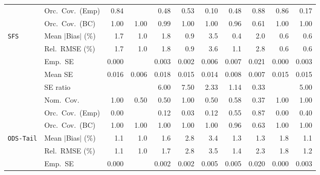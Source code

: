\begin{landscape}
\begin{longtable}{llrrrrrrrrr}
 & Orc.\ Cov.\ (Emp) & \cellcolor{rankthree}0.84 &  & 0.48 & 0.53 & 0.10 & 0.48 & \cellcolor{rankone}0.88 & \cellcolor{ranktwo}0.86 & 0.17 \\
 & Orc.\ Cov.\ (BC) & \cellcolor{rankthree}1.00 & \cellcolor{rankthree}1.00 & \cellcolor{ranktwo}0.99 & \cellcolor{rankthree}1.00 & \cellcolor{rankthree}1.00 & \cellcolor{rankone}0.96 & 0.61 & \cellcolor{rankthree}1.00 & \cellcolor{rankthree}1.00 \\
\addlinespace[2pt]
\quad \texttt{SFS} & Mean $|$Bias$|$ (\%) & 1.7 & 1.0 & 1.8 & \cellcolor{rankthree}0.9 & 3.5 & \cellcolor{rankone}0.4 & 2.0 & \cellcolor{ranktwo}0.6 & \cellcolor{ranktwo}0.6 \\
 & Rel.\ RMSE (\%) & 1.7 & \cellcolor{rankthree}1.0 & 1.8 & \cellcolor{ranktwo}0.9 & 3.6 & 1.1 & 2.8 & \cellcolor{rankone}0.6 & \cellcolor{rankone}0.6 \\
 & Emp.\ SE & 0.000 &  & 0.003 & 0.002 & 0.006 & 0.007 & 0.021 & 0.000 & 0.003 \\
 & Mean SE & 0.016 & 0.006 & 0.018 & 0.015 & 0.014 & 0.008 & 0.007 & 0.015 & 0.015 \\
 & SE ratio &  &  & 6.00 & 7.50 & \cellcolor{rankthree}2.33 & \cellcolor{rankone}1.14 & \cellcolor{ranktwo}0.33 &  & 5.00 \\
 & Nom.\ Cov. & \cellcolor{rankone}1.00 & \cellcolor{rankthree}0.50 & \cellcolor{rankthree}0.50 & \cellcolor{rankone}1.00 & \cellcolor{rankthree}0.50 & \cellcolor{ranktwo}0.58 & 0.37 & \cellcolor{rankone}1.00 & \cellcolor{rankone}1.00 \\
 & Orc.\ Cov.\ (Emp) & 0.00 &  & 0.12 & 0.03 & 0.12 & \cellcolor{ranktwo}0.55 & \cellcolor{rankone}0.87 & 0.00 & \cellcolor{rankthree}0.40 \\
 & Orc.\ Cov.\ (BC) & \cellcolor{ranktwo}1.00 & \cellcolor{ranktwo}1.00 & \cellcolor{ranktwo}1.00 & \cellcolor{ranktwo}1.00 & \cellcolor{ranktwo}1.00 & \cellcolor{rankone}0.96 & \cellcolor{rankthree}0.63 & \cellcolor{ranktwo}1.00 & \cellcolor{ranktwo}1.00 \\
\addlinespace[2pt]
\quad \texttt{ODS-Tail} & Mean $|$Bias$|$ (\%) & \cellcolor{ranktwo}1.1 & \cellcolor{rankone}1.0 & 1.6 & 2.8 & 3.4 & \cellcolor{rankthree}1.3 & \cellcolor{rankthree}1.3 & 1.8 & \cellcolor{ranktwo}1.1 \\
 & Rel.\ RMSE (\%) & \cellcolor{ranktwo}1.1 & \cellcolor{rankone}1.0 & 1.7 & 2.8 & 3.5 & 1.4 & 2.3 & 1.8 & \cellcolor{rankthree}1.2 \\
 & Emp.\ SE & 0.000 &  & 0.002 & 0.002 & 0.005 & 0.005 & 0.020 & 0.000 & 0.003 \\

\end{longtable}
\end{landscape}

